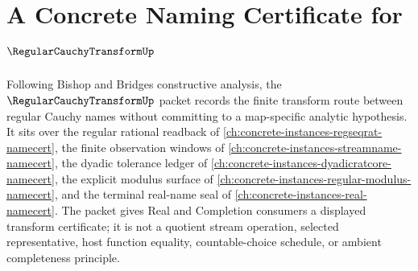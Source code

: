 \chapter{A Concrete Naming Certificate for $\RegularCauchyTransformUp$}
\label{ch:concrete-instances-regular-cauchy-transform-namecert}

Following Bishop and Bridges constructive analysis, the $\RegularCauchyTransformUp$ packet records the finite transform route between regular Cauchy names without committing to a map-specific analytic hypothesis. It sits over the regular rational readback of \autoref{ch:concrete-instances-regseqrat-namecert}, the finite observation windows of \autoref{ch:concrete-instances-streamname-namecert}, the dyadic tolerance ledger of \autoref{ch:concrete-instances-dyadicratcore-namecert}, the explicit modulus surface of \autoref{ch:concrete-instances-regular-modulus-namecert}, and the terminal real-name seal of \autoref{ch:concrete-instances-real-namecert}. The packet gives Real and Completion consumers a displayed transform certificate; it is not a quotient stream operation, selected representative, host function equality, countable-choice schedule, or ambient completeness principle.


